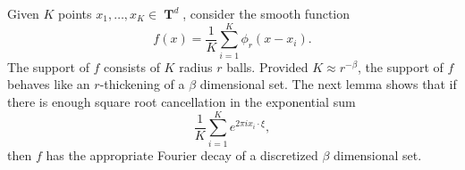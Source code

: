 \documentclass[12pt,reqno]{article}
\numberwithin{equation}{section}
\DeclareMathOperator{\ZZ}{\mathbf{Z}}
\DeclareMathOperator{\TT}{\mathbf{T}}
\newtheorem{lemma}{Lemma}
\begin{document}
Given $K$ points $x_1,\dots,x_K \in \TT^d$, consider the smooth function
%
\[ f(x) = \frac{1}{K} \sum_{i = 1}^K \phi_r(x - x_i). \]
%
The support of $f$ consists of $K$ radius $r$ balls. Provided $K \approx r^{-\beta}$, the support of $f$ behaves like an $r$-thickening of a $\beta$ dimensional set. The next lemma shows that if there is enough square root cancellation in the exponential sum
%
\[ \frac{1}{K} \sum_{i = 1}^K e^{2 \pi i x_i \cdot \xi}, \]
%
then $f$ has the appropriate Fourier decay of a discretized $\beta$ dimensional set.

\begin{comment}

\begin{lemma} \label{Lemma65493}
    Fix $C > 0$, $r,\varepsilon_1 > 0$, and $\beta \in (0,d/2]$. Consider $K$ points $x_1, \dots, x_K \in \TT^d$ such that for each $\xi \in \ZZ^d$ with $0 < |\xi| \leq 1/r^{1+\varepsilon_1}$,
    \begin{equation} \label{equationOIJDOIJIO}
        \left| \frac{1}{K} \sum_{i = 1}^K e^{2 \pi i x_i \cdot \xi} \right| \leq C |\xi|^{-\beta}.
    \end{equation}
    Then if we define
    \[ f(x) = \frac{1}{K} \sum_{i = 1}^K \phi_{r}(x - x_i), \]
    then $\| f \|_{M(\beta-\varepsilon_1)} \lesssim_{d,\varepsilon_1} C$.
\end{lemma}
\begin{proof}
    Set
    \[ D(x) = \frac{1}{K} \sum_{i = 1}^K \delta(x - x_i), \]
    then \eqref{equationOIJDOIJIO} is equivalent to the property that for each $\xi \in \ZZ^d$ with $0 < |\xi| \leq 1/r^{1 + \varepsilon_1}$,
    \begin{equation} \label{equationFFOSOXPFFGHI}
        |\widehat{D}(\xi)| \leq C |\xi|^{-\beta}.
    \end{equation}
    Noting that $f = D * \phi_{r}$, we conclude that
    \begin{equation} \label{equation6666GGCIS}
        |\widehat{f}| = |\widehat{D}| |\widehat{\phi_{r}}|.
    \end{equation}
    For $0 < |\xi| \leq 1/r^{1 + \varepsilon_1}$, we combine \eqref{equationFFOSOXPFFGHI}, \eqref{equation6666GGCIS} and \eqref{equationDIOJAOIJVIV23242} to conclude that
    \begin{equation} \label{equationGGIOHISI99234}
        |\widehat{f}(\xi)| \leq C |\xi|^{-\beta} \leq C |\xi|^{\varepsilon_1 - \beta}.
    \end{equation}
    For $|\xi| \geq 1/r^{1 + \varepsilon_1}$, we note that \eqref{molificationdecaybound} implies $\widehat{\phi_{r}}(\xi) \lesssim_T r^{-T} |\xi|^{-T}$, and so if $T \geq \beta$,
    \begin{equation} \label{equationDIICCCJSXVVM21}
        |\widehat{f}(\xi)| \lesssim_T [r^{-T} |\xi|^{\beta-T}] |\xi|^{-\beta} \leq [r^{-T} r^{-(1+\varepsilon_1)(\beta-T)}] |\xi|^{-\beta} \leq r^{-(1+\varepsilon_1) \beta + \varepsilon_1 T} |\xi|^{-\beta}.
    \end{equation}
    Setting $T = (1 + 1/\varepsilon_1) \cdot \beta$ gives $|\widehat{f}(\xi)| \lesssim_{\varepsilon_1,d} |\xi|^{-\beta}$.
\end{proof}


\end{comment}
\end{document}

